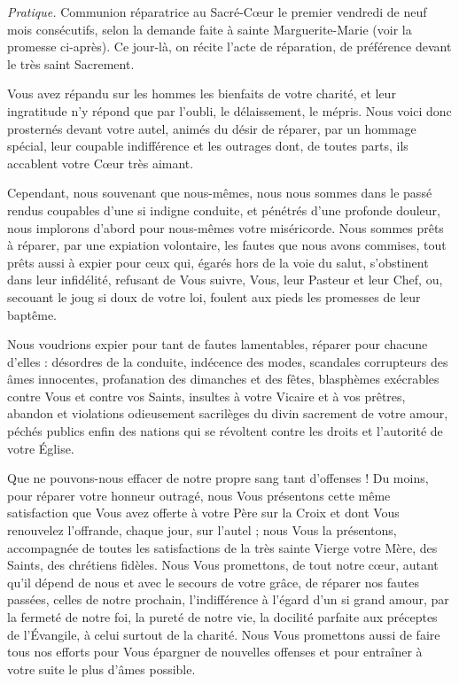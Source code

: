 \documentclass{bibliotheca-missel}
\begin{document}

\begin{notice}\textit{Pratique.} Communion réparatrice au Sacré-Cœur le premier vendredi de neuf mois consécutifs, selon la demande faite à sainte Marguerite-Marie (voir la promesse ci-après). Ce jour-là, on récite l’acte de réparation, de préférence devant le très saint Sacrement.\end{notice}
 Vous avez répandu sur les hommes les bienfaits de votre charité, et leur ingratitude n’y répond que par l’oubli, le délaissement, le mépris. Nous voici donc prosternés devant votre autel, animés du désir de réparer, par un hommage spécial, leur coupable indifférence et les outrages dont, de toutes parts, ils accablent votre Cœur très aimant.

Cependant, nous souvenant que nous-mêmes, nous nous sommes dans le passé rendus coupables d’une si indigne conduite, et pénétrés d’une profonde douleur, nous implorons d’abord pour nous-mêmes votre miséricorde. Nous sommes prêts à réparer, par une expiation volontaire, les fautes que nous avons commises, tout prêts aussi à expier pour ceux qui, égarés hors de la voie du salut, s’obstinent dans leur infidélité, refusant de Vous suivre, Vous, leur Pasteur et leur Chef, ou, secouant le joug si doux de votre loi, foulent aux pieds les promesses de leur baptême.

Nous voudrions expier pour tant de fautes lamentables, réparer pour chacune d’elles : désordres de la conduite, indécence des modes, scandales corrupteurs des âmes innocentes, profanation des dimanches et des fêtes, blasphèmes exécrables contre Vous et contre vos Saints, insultes à votre Vicaire et à vos prêtres, abandon et violations odieusement sacrilèges du divin sacrement de votre amour, péchés publics enfin des nations qui se révoltent contre les droits et l’autorité de votre Église.

Que ne pouvons-nous effacer de notre propre sang tant d’offenses ! Du moins, pour réparer votre honneur outragé, nous Vous présentons cette même satisfaction que Vous avez offerte à votre Père sur la Croix et dont Vous renouvelez l’offrande, chaque jour, sur l’autel ; nous Vous la présentons, accompagnée de toutes les satisfactions de la très sainte Vierge votre Mère, des Saints, des chrétiens fidèles. Nous Vous promettons, de tout notre cœur, autant qu’il dépend de nous et avec le secours de votre grâce, de réparer nos fautes passées, celles de notre prochain, l’indifférence à l’égard d’un si grand amour, par la fermeté de notre foi, la pureté de notre vie, la docilité parfaite aux préceptes de l’Évangile, à celui surtout de la charité. Nous Vous promettons aussi de faire tous nos efforts pour Vous épargner de nouvelles offenses et pour entraîner à votre suite le plus d’âmes possible.
\end{document}

